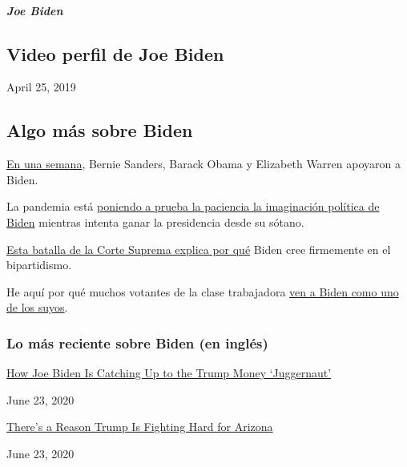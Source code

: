 \hypertarget{joe-biden-1}{%
\subparagraph{Joe Biden}\label{joe-biden-1}}

\hypertarget{video-perfil-de-joe-biden}{%
\subsection{Video perfil de Joe Biden}\label{video-perfil-de-joe-biden}}

April 25, 2019

\hypertarget{algo-muxe1s-sobre-biden}{%
\subsection{Algo más sobre Biden}\label{algo-muxe1s-sobre-biden}}

\href{https://www.nytimes.com/2020/04/15/us/politics/elizabeth-warren-endorse-biden.html?action=click\&module=RelatedLinks\&pgtype=Article}{En
una semana}, Bernie Sanders, Barack Obama y Elizabeth Warren apoyaron a
Biden.

La pandemia está
\href{https://www.nytimes.com/2020/04/25/us/politics/joe-biden-coronavirus-quarantine.html}{poniendo
a prueba la paciencia la imaginación política de Biden} mientras intenta
ganar la presidencia desde su sótano.

\href{https://www.nytimes.com/2019/09/07/us/politics/joe-biden-bork-supreme-court.html}{Esta
batalla de la Corte Suprema explica por qué} Biden cree firmemente en el
bipartidismo.

He aquí por qué muchos votantes de la clase trabajadora
\href{https://www.nytimes.com/2019/11/19/us/politics/joe-biden-working-class.html}{ven
a Biden como uno de los suyos}.

\hypertarget{lo-muxe1s-reciente-sobre-biden-en-ingluxe9s}{%
\subsubsection{Lo más reciente sobre Biden (en
inglés)}\label{lo-muxe1s-reciente-sobre-biden-en-ingluxe9s}}

\href{https://www.nytimes.com/2020/06/23/us/politics/biden-trump-2020-fundraising.html}{How
Joe Biden Is Catching Up to the Trump Money `Juggernaut'}

June 23, 2020

\href{https://www.nytimes.com/2020/06/23/us/politics/arizona-2020-election-democrats-republicans.html}{There's
a Reason Trump Is Fighting Hard for Arizona}

June 23, 2020

